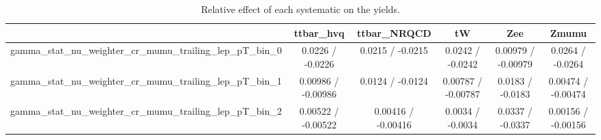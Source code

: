 \documentclass[10pt]{article}
\begin{document}
\begin{table}[htbp]
\begin{center}
\begin{tabular}{|c|c|c|c|c|c|}
\hline 
      & ttbar_hvq      & ttbar_NRQCD      & tW      & Zee      & Zmumu \\ 
\hline 
  gamma_stat_nu_weighter_cr_mumu_trailing_lep_pT_bin_0 & 0.0226 / -0.0226 & 0.0215 / -0.0215 & 0.0242 / -0.0242 & 0.00979 / -0.00979 & 0.0264 / -0.0264 \\ 
  gamma_stat_nu_weighter_cr_mumu_trailing_lep_pT_bin_1 & 0.00986 / -0.00986 & 0.0124 / -0.0124 & 0.00787 / -0.00787 & 0.0183 / -0.0183 & 0.00474 / -0.00474 \\ 
  gamma_stat_nu_weighter_cr_mumu_trailing_lep_pT_bin_2 & 0.00522 / -0.00522 & 0.00416 / -0.00416 & 0.0034 / -0.0034 & 0.0337 / -0.0337 & 0.00156 / -0.00156 \\ 
\hline 
\end{tabular} 
\caption{Relative effect of each systematic on the yields.} 
\end{center} 
\end{table} 
\end{document}
